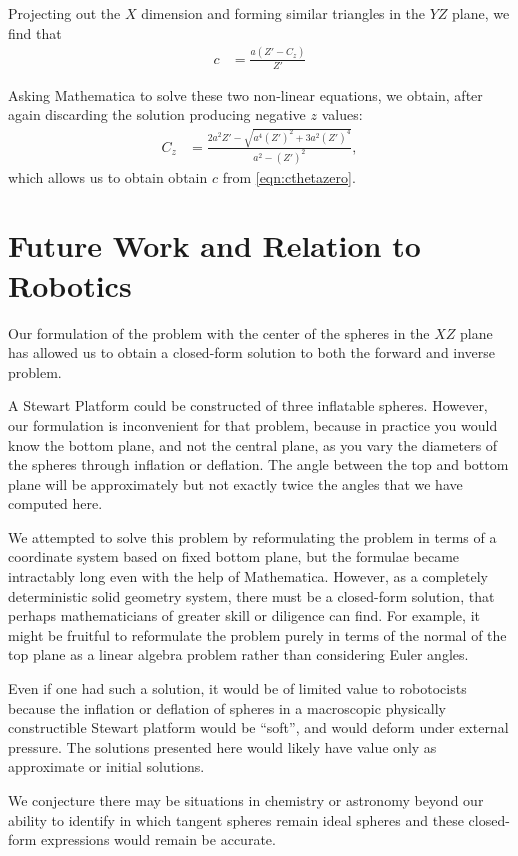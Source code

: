 \documentclass{article}
\begin{document}
Projecting out the $X$ dimension and forming
similar triangles in the $YZ$ plane, we find that
\begin{align}
  c &= \frac{a( Z' -C_z )}{Z'} \label{eqn:cthetazero}
\end{align}

Asking Mathematica to solve these two non-linear equations, we obtain,
after again discarding the solution producing negative $z$ values:
\begin{align}
 C_z &=  \frac{2 a^2 Z' - \sqrt{a^4 (Z')^2 + 3 a^2 (Z')^4}}{a^2 - (Z')^2},
\end{align}
which allows us to obtain obtain $c$ from \ref{eqn:cthetazero}.

\section{Future Work and Relation to Robotics}

Our formulation of the problem with the center of the spheres in the $XZ$
plane has allowed us to obtain a closed-form solution to both the forward
and inverse problem.

A Stewart Platform could be constructed of three inflatable spheres.
However, our formulation is inconvenient for that problem, because
in practice you would know the bottom plane, and not the central plane,
as you vary the diameters of the spheres through inflation or deflation.
The angle between the top and bottom plane will be approximately but not
exactly twice the angles that we have computed here.

We attempted to solve this problem by reformulating the problem in terms
of a coordinate system based on fixed bottom plane, but
the formulae became intractably long even with the help of Mathematica.
However, as a completely deterministic solid geometry system, there
must be a closed-form solution, that perhaps mathematicians of greater
skill or diligence can find.
For example, it might be fruitful to reformulate the problem purely
in terms of the normal of the top plane as a linear algebra problem rather than
considering Euler angles.

Even if one had such a solution, it would be of limited value
to robotocists because the inflation or deflation of spheres in
a macroscopic physically constructible Stewart platform would
be ``soft'', and would deform under external pressure. The solutions
presented here would likely have value only as approximate or initial
solutions.

We conjecture there may be situations in chemistry or astronomy
beyond our ability to identify
in which tangent spheres remain ideal spheres and these closed-form expressions
would remain be accurate.
\end{document}
